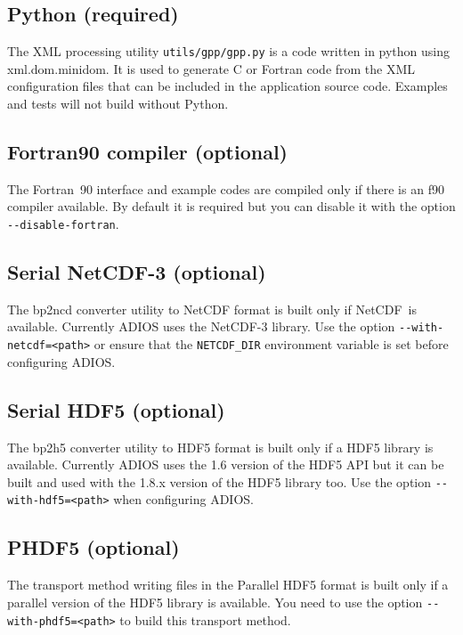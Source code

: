 \subsection{Python (required)}

The XML processing utility \verb+utils/gpp/gpp.py+ is a code written in python using xml.dom.minidom. 
It is used to generate C or Fortran code from the XML configuration files that 
can be included in the application source code.  Examples and tests will not build 
without Python. 

\subsection{Fortran90 compiler (optional)}

The Fortran~90 interface and example codes are compiled only if there is an f90 
compiler available. By default it is required but you can disable it with the option 
\verb+--disable-fortran+.

\subsection{Serial NetCDF-3 (optional)}

The bp2ncd converter utility to NetCDF format is built only if NetCDF~is available. 
 Currently ADIOS uses the NetCDF-3 library. Use the option \verb+--with-netcdf=<path>+ 
or ensure that the \verb+NETCDF_DIR+ environment variable is set before configuring ADIOS.

\subsection{Serial HDF5 (optional)}

The bp2h5 converter utility to HDF5 format is built only if a HDF5 library is available. 
Currently ADIOS uses the 1.6 version of the HDF5 API but it can be built and used 
with the 1.8.x version of the HDF5 library too. Use the option \verb+--with-hdf5=<path>+ 
when configuring ADIOS.

\subsection{PHDF5 (optional)}

The transport method writing files in the Parallel HDF5 format is built only if 
a parallel version of the HDF5 library is available. You need to use the 
option \verb+--with-phdf5=<path>+ to build this transport method. 

